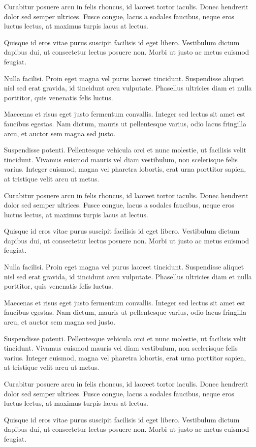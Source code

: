 Curabitur posuere arcu in felis rhoncus, id laoreet tortor iaculis. Donec hendrerit dolor sed semper ultrices. Fusce congue, lacus a sodales faucibus, neque eros luctus lectus, at maximus turpis lacus at lectus.

Quisque id eros vitae purus suscipit facilisis id eget libero. Vestibulum dictum dapibus dui, ut consectetur lectus posuere non. Morbi ut justo ac metus euismod feugiat.

Nulla facilisi. Proin eget magna vel purus laoreet tincidunt. Suspendisse aliquet nisl sed erat gravida, id tincidunt arcu vulputate. Phasellus ultricies diam et nulla porttitor, quis venenatis felis luctus.

Maecenas et risus eget justo fermentum convallis. Integer sed lectus sit amet est faucibus egestas. Nam dictum, mauris ut pellentesque varius, odio lacus fringilla arcu, et auctor sem magna sed justo.

Suspendisse potenti. Pellentesque vehicula orci et nunc molestie, ut facilisis velit tincidunt. Vivamus euismod mauris vel diam vestibulum, non scelerisque felis varius. Integer euismod, magna vel pharetra lobortis, erat urna porttitor sapien, at tristique velit arcu ut metus.

Curabitur posuere arcu in felis rhoncus, id laoreet tortor iaculis. Donec hendrerit dolor sed semper ultrices. Fusce congue, lacus a sodales faucibus, neque eros luctus lectus, at maximus turpis lacus at lectus.

Quisque id eros vitae purus suscipit facilisis id eget libero. Vestibulum dictum dapibus dui, ut consectetur lectus posuere non. Morbi ut justo ac metus euismod feugiat.

Nulla facilisi. Proin eget magna vel purus laoreet tincidunt. Suspendisse aliquet nisl sed erat gravida, id tincidunt arcu vulputate. Phasellus ultricies diam et nulla porttitor, quis venenatis felis luctus.

Maecenas et risus eget justo fermentum convallis. Integer sed lectus sit amet est faucibus egestas. Nam dictum, mauris ut pellentesque varius, odio lacus fringilla arcu, et auctor sem magna sed justo.

Suspendisse potenti. Pellentesque vehicula orci et nunc molestie, ut facilisis velit tincidunt. Vivamus euismod mauris vel diam vestibulum, non scelerisque felis varius. Integer euismod, magna vel pharetra lobortis, erat urna porttitor sapien, at tristique velit arcu ut metus.

Curabitur posuere arcu in felis rhoncus, id laoreet tortor iaculis. Donec hendrerit dolor sed semper ultrices. Fusce congue, lacus a sodales faucibus, neque eros luctus lectus, at maximus turpis lacus at lectus.

Quisque id eros vitae purus suscipit facilisis id eget libero. Vestibulum dictum dapibus dui, ut consectetur lectus posuere non. Morbi ut justo ac metus euismod feugiat.

